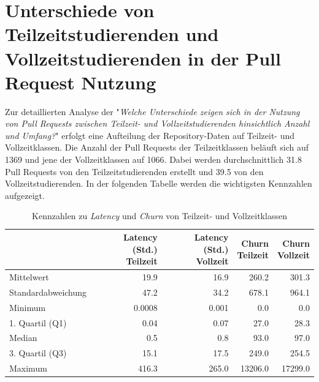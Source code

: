 \section{Unterschiede von Teilzeitstudierenden und Vollzeitstudierenden in der Pull Request Nutzung}
Zur detaillierten Analyse der  "\textit{Welche Unterschiede zeigen sich in der Nutzung von Pull Requests zwischen Teilzeit- und Vollzeitstudierenden hinsichtlich Anzahl und Umfang?}" erfolgt eine Aufteilung der Repository-Daten auf Teilzeit- und Vollzeitklassen. Die Anzahl der Pull Requests der Teilzeitklassen beläuft sich auf 1369 und jene der Vollzeitklassen auf 1066. Dabei werden durchschnittlich 31.8 Pull Requests von den Teilzeitstudierenden erstellt und 39.5 von den Vollzeitstudierenden. In der folgenden Tabelle werden die wichtigsten Kennzahlen aufgezeigt.

\begin{table}[htbp]
    \centering
    \caption{Kennzahlen zu \textit{Latency} und \textit{Churn} von Teilzeit- und Vollzeitklassen}
    \begin{tabular}{@{}lrrrr@{}}
        \toprule
        \makecell{}&
        \makecell{\textbf{Latency (Std.)} \\ \textbf{Teilzeit}}&
        \makecell{\textbf{Latency (Std.)} \\ \textbf{Vollzeit}}&
        \makecell{\textbf{Churn} \\ \textbf{Teilzeit}}&
        \makecell{\textbf{Churn} \\ \textbf{Vollzeit}}\\
        \midrule
        Mittelwert & 19.9 & 16.9 & 260.2 & 301.3 \\
        Standardabweichung &  47.2 & 34.2  & 678.1 & 964.1 \\
        Minimum & 0.0008 & 0.001 & 0.0 & 0.0 \\
        1. Quartil (Q1) & 0.04 & 0.07 & 27.0 & 28.3\\
        Median & 0.5 & 0.8 & 93.0 & 97.0 \\
        3. Quartil (Q3) &  15.1 & 17.5 & 249.0 & 254.5 \\
        Maximum & 416.3 & 265.0 & 13206.0 & 17299.0 \\
        \bottomrule
    \end{tabular}
    \label{tab:deskriptive-kennzahlen-teilzeit-vollzeit}
\end{table}

